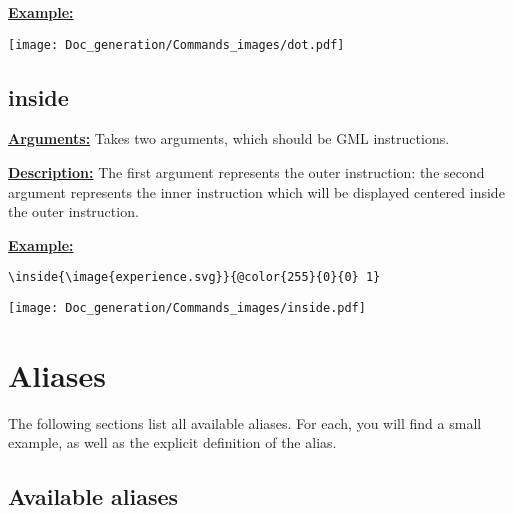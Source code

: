 \documentclass{article}
\begin{document}
\textbf{\underline{Example:}}

\begin{minipage}{0.45\linewidth}
\raggedright
\begin{spverbatim}
 \dot \dot

\end{spverbatim}
\end{minipage}
\begin{minipage}{0.45\linewidth}
\raggedleft
\texttt{[image: Doc\_generation/Commands\_images/dot.pdf]}
\end{minipage} 

\subsection{inside}
\textbf{\underline{Arguments:}} Takes two arguments, which should be GML instructions.

\textbf{\underline{Description:}} The first argument represents the outer instruction: the second argument represents the inner instruction which will be displayed centered inside the outer instruction.

\textbf{\underline{Example:}}

\begin{center}
\begin{BVerbatim}
\inside{\image{experience.svg}}{@color{255}{0}{0} 1}
\end{BVerbatim}
\end{center}
\begin{center}
\texttt{[image: Doc\_generation/Commands\_images/inside.pdf]}
\end{center}





\newpage
\section{Aliases}
The following sections list all available aliases. For each, you will find a small example, as well as the explicit definition of the alias.

\subsection{Available aliases}

\end{document}
